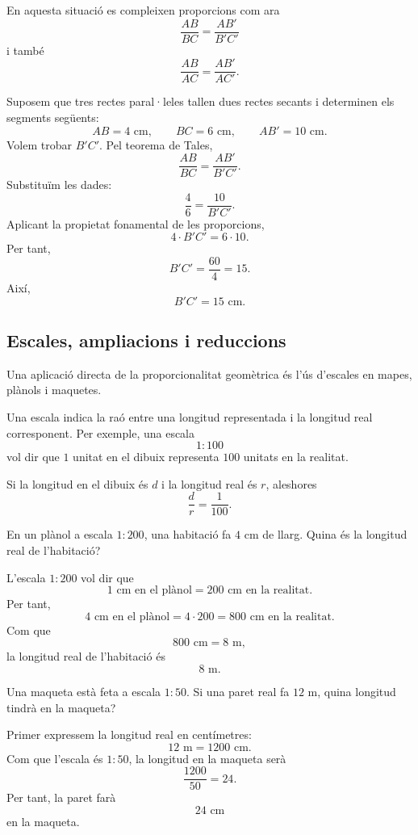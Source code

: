 En aquesta situació es compleixen proporcions com ara
\[
	\frac{AB}{BC}
	=
	\frac{AB'}{B'C'}
\]
i també
\[
	\frac{AB}{AC}
	=
	\frac{AB'}{AC'}.
\]

\begin{exemple}
Suposem que tres rectes paral·leles tallen dues rectes secants i determinen els segments següents:
\[
	AB=4\text{ cm},\qquad BC=6\text{ cm},\qquad AB'=10\text{ cm}.
\]
Volem trobar \(B'C'\). Pel teorema de Tales,
\[
	\frac{AB}{BC}
	=
	\frac{AB'}{B'C'}.
\]
Substituïm les dades:
\[
	\frac{4}{6}
	=
	\frac{10}{B'C'}.
\]
Aplicant la propietat fonamental de les proporcions,
\[
	4\cdot B'C'=6\cdot 10.
\]
Per tant,
\[
	B'C'=\frac{60}{4}=15.
\]
Així,
\[
	B'C'=15\text{ cm}.
\]
\end{exemple}

\subsection{Escales, ampliacions i reduccions}

Una aplicació directa de la proporcionalitat geomètrica és l'ús d'escales en mapes, plànols i maquetes.

Una escala indica la raó entre una longitud representada i la longitud real corresponent. Per exemple, una escala
\[
	1:100
\]
vol dir que \(1\) unitat en el dibuix representa \(100\) unitats en la realitat.

Si la longitud en el dibuix és \(d\) i la longitud real és \(r\), aleshores
\[
	\frac{d}{r}
	=
	\frac{1}{100}.
\]

\begin{exemple}
En un plànol a escala \(1:200\), una habitació fa \(4\) cm de llarg. Quina és la longitud real de l'habitació?

L'escala \(1:200\) vol dir que
\[
	1\text{ cm en el plànol}=200\text{ cm en la realitat}.
\]
Per tant,
\[
	4\text{ cm en el plànol}=4\cdot 200=800\text{ cm en la realitat}.
\]
Com que
\[
	800\text{ cm}=8\text{ m},
\]
la longitud real de l'habitació és
\[
	8\text{ m}.
\]
\end{exemple}

\begin{exemple}
Una maqueta està feta a escala \(1:50\). Si una paret real fa \(12\) m, quina longitud tindrà en la maqueta?

Primer expressem la longitud real en centímetres:
\[
	12\text{ m}=1200\text{ cm}.
\]
Com que l'escala és \(1:50\), la longitud en la maqueta serà
\[
	\frac{1200}{50}=24.
\]
Per tant, la paret farà
\[
	24\text{ cm}
\]
en la maqueta.
\end{exemple}

